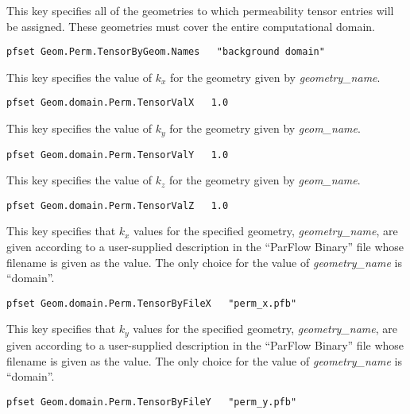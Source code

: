 {
This key specifies all of the geometries to which permeability tensor entries
will be assigned.  These geometries must cover the entire computational
domain.
}
\begin{display}\begin{verbatim}
pfset Geom.Perm.TensorByGeom.Names   "background domain" 
\end{verbatim}\end{display}

{
This key specifies the value of $k_x$ for the geometry given by {\em
geometry\_name}.
}
\begin{display}\begin{verbatim}
pfset Geom.domain.Perm.TensorValX   1.0
\end{verbatim}\end{display}

{
This key specifies the value of $k_y$ for the geometry given by {\em
geom\_name}.
}
\begin{display}\begin{verbatim}
pfset Geom.domain.Perm.TensorValY   1.0
\end{verbatim}\end{display}

{
This key specifies the value of $k_z$ for the geometry given by {\em
geom\_name}.
}
\begin{display}\begin{verbatim}
pfset Geom.domain.Perm.TensorValZ   1.0
\end{verbatim}\end{display}

{
This key specifies that $k_x$ values for the specified geometry,
{\em geometry\_name}, are given according to a user-supplied description
in the ``ParFlow Binary'' file whose filename is given as the value.
The only choice for the value of {\em geometry\_name} is ``domain''.
}
\begin{display}\begin{verbatim}
pfset Geom.domain.Perm.TensorByFileX   "perm_x.pfb"
\end{verbatim}\end{display}

{
This key specifies that $k_y$ values for the specified geometry,
{\em geometry\_name}, are given according to a user-supplied description
in the ``ParFlow Binary'' file whose filename is given as the value.
The only choice for the value of {\em geometry\_name} is ``domain''.
}
\begin{display}\begin{verbatim}
pfset Geom.domain.Perm.TensorByFileY   "perm_y.pfb"
\end{verbatim}\end{display}

